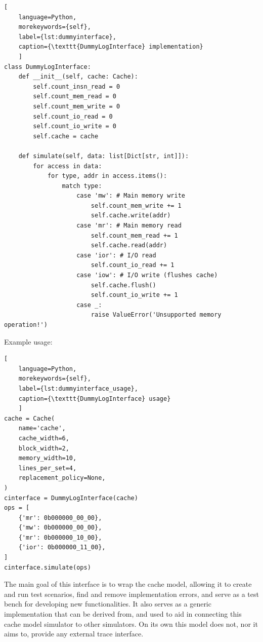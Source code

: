 \begin{center}
\centering
\begin{minipage}{\linewidth}
\begin{lstlisting}[
    language=Python,
	morekeywords={self},
    label={lst:dummyinterface},
    caption={\texttt{DummyLogInterface} implementation}
    ]
class DummyLogInterface:
    def __init__(self, cache: Cache):
        self.count_insn_read = 0
        self.count_mem_read = 0
        self.count_mem_write = 0
        self.count_io_read = 0
        self.count_io_write = 0
        self.cache = cache

    def simulate(self, data: list[Dict[str, int]]):
        for access in data:
            for type, addr in access.items():
                match type:
                    case 'mw': # Main memory write
                        self.count_mem_write += 1
                        self.cache.write(addr)
                    case 'mr': # Main memory read
                        self.count_mem_read += 1
                        self.cache.read(addr)
                    case 'ior': # I/O read
                        self.count_io_read += 1
                    case 'iow': # I/O write (flushes cache)
                        self.cache.flush()
                        self.count_io_write += 1
                    case _:
                        raise ValueError('Unsupported memory operation!')
\end{lstlisting}
\end{minipage}
\end{center}

\noindent Example usage:

\begin{center}
\centering
\begin{minipage}{\linewidth}
\begin{lstlisting}[
    language=Python,
	morekeywords={self},
    label={lst:dummyinterface_usage},
    caption={\texttt{DummyLogInterface} usage}
    ]
cache = Cache(
    name='cache',
    cache_width=6,
    block_width=2,
    memory_width=10,
    lines_per_set=4,
    replacement_policy=None,
)
cinterface = DummyLogInterface(cache)
ops = [
    {'mr': 0b000000_00_00},
    {'mw': 0b000000_00_00},
    {'mr': 0b000000_10_00},
    {'ior': 0b000000_11_00},    
]
cinterface.simulate(ops)
\end{lstlisting}
\end{minipage}
\end{center}

\noindent The main goal of this interface is to wrap the cache model, allowing it to create and run test scenarios, find and remove implementation errors, and
serve as a test bench for developing new functionalities. It also serves as a generic implementation that can be derived from, and used to aid in connecting this cache model simulator
to other simulators. On its own this model does not, nor it aims to, provide any external trace interface.

